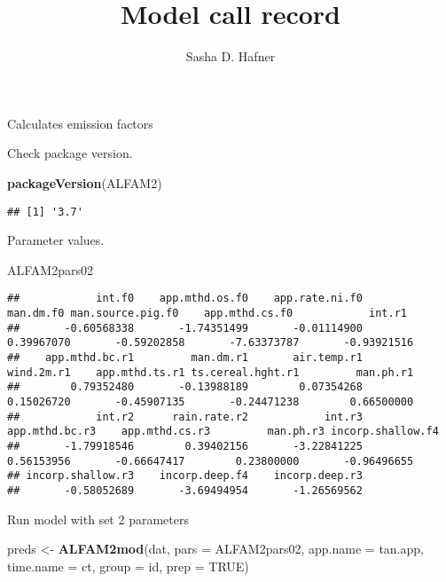 \documentclass[
  landscape]{article}
\title{Model call record}
\author{Sasha D. Hafner}
\date{}
\newenvironment{Shaded}{\begin{snugshade}}{\end{snugshade}}
\newcommand{\AttributeTok}[1]{\textcolor[rgb]{0.13,0.29,0.53}{#1}}
\newcommand{\ConstantTok}[1]{\textcolor[rgb]{0.56,0.35,0.01}{#1}}
\newcommand{\FunctionTok}[1]{\textcolor[rgb]{0.13,0.29,0.53}{\textbf{#1}}}
\newcommand{\NormalTok}[1]{#1}
\newcommand{\OtherTok}[1]{\textcolor[rgb]{0.56,0.35,0.01}{#1}}
\newcommand{\StringTok}[1]{\textcolor[rgb]{0.31,0.60,0.02}{#1}}
\begin{document}
\maketitle

Calculates emission factors

Check package version.

\begin{Shaded}
\begin{Highlighting}[]
\FunctionTok{packageVersion}\NormalTok{(}\StringTok{\textquotesingle{}ALFAM2\textquotesingle{}}\NormalTok{)}
\end{Highlighting}
\end{Shaded}

\begin{verbatim}
## [1] '3.7'
\end{verbatim}

Parameter values.

\begin{Shaded}
\begin{Highlighting}[]
\NormalTok{ALFAM2pars02}
\end{Highlighting}
\end{Shaded}

\begin{verbatim}
##            int.f0    app.mthd.os.f0    app.rate.ni.f0         man.dm.f0 man.source.pig.f0    app.mthd.cs.f0            int.r1 
##       -0.60568338       -1.74351499       -0.01114900        0.39967070       -0.59202858       -7.63373787       -0.93921516 
##    app.mthd.bc.r1         man.dm.r1       air.temp.r1        wind.2m.r1    app.mthd.ts.r1 ts.cereal.hght.r1         man.ph.r1 
##        0.79352480       -0.13988189        0.07354268        0.15026720       -0.45907135       -0.24471238        0.66500000 
##            int.r2      rain.rate.r2            int.r3    app.mthd.bc.r3    app.mthd.cs.r3         man.ph.r3 incorp.shallow.f4 
##       -1.79918546        0.39402156       -3.22841225        0.56153956       -0.66647417        0.23800000       -0.96496655 
## incorp.shallow.r3    incorp.deep.f4    incorp.deep.r3 
##       -0.58052689       -3.69494954       -1.26569562
\end{verbatim}

Run model with set 2 parameters

\begin{Shaded}
\begin{Highlighting}[]
\NormalTok{preds }\OtherTok{\textless{}{-}} \FunctionTok{ALFAM2mod}\NormalTok{(dat, }\AttributeTok{pars =}\NormalTok{ ALFAM2pars02, }\AttributeTok{app.name =} \StringTok{\textquotesingle{}tan.app\textquotesingle{}}\NormalTok{, }\AttributeTok{time.name =} \StringTok{\textquotesingle{}ct\textquotesingle{}}\NormalTok{, }\AttributeTok{group =} \StringTok{\textquotesingle{}id\textquotesingle{}}\NormalTok{, }\AttributeTok{prep =} \ConstantTok{TRUE}\NormalTok{)}
\end{Highlighting}
\end{Shaded}
\end{document}

